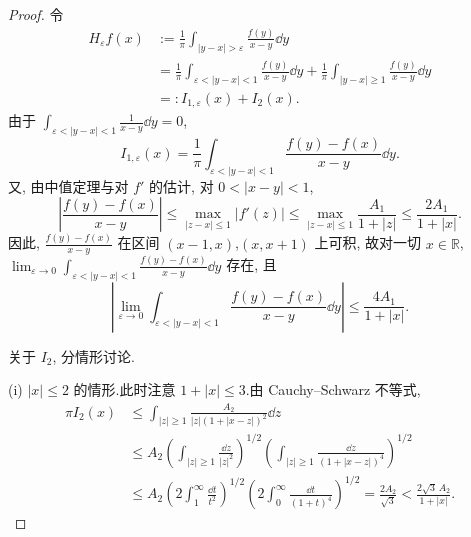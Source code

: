 \begin{proof}
令
\begin{align*}
H_{\varepsilon}f(x) & := \frac{1}{\pi}\int_{|y - x| > \varepsilon}\frac{f(y)}{x - y}\dd y \\
& = \frac{1}{\pi}\int_{\varepsilon < |y - x| < 1}\frac{f(y)}{x - y}\dd y + \frac{1}{\pi}\int_{|y - x| \geq 1}\frac{f(y)}{x - y}\dd y \\
& =: I_{1,\varepsilon}(x) + I_{2}(x).
\end{align*}
由于 $\int_{\varepsilon < |y - x| < 1}\frac{1}{x - y}\dd y = 0$, 
\begin{equation*}
I_{1,\varepsilon}(x) = \frac{1}{\pi}\int_{\varepsilon < |y - x| < 1}\frac{f(y) - f(x)}{x - y}\dd y.
\end{equation*}
又, 由中值定理与对 $f'$ 的估计, 对 $0 < |x - y| < 1$, 
\begin{equation*}
\left|\frac{f(y) - f(x)}{x - y}\right| \leq \max_{|z - x| \leq 1}|f'(z)| \leq \max_{|z - x| \leq 1}\frac{A_{1}}{1 + |z|} \leq \frac{2A_{1}}{1 + |x|}.
\end{equation*}
因此, $\frac{f(y) - f(x)}{x - y}$ 在区间 $(x - 1, x)$,$(x, x + 1)$ 上可积, 故对一切 $x \in \mathbb{R}$, $\lim_{\varepsilon \to 0}\int_{\varepsilon < |y - x| < 1}\frac{f(y) - f(x)}{x - y}\dd y$ 存在, 且
\begin{equation*}
\left|\lim_{\varepsilon \to 0}\int_{\varepsilon < |y - x| < 1}\frac{f(y) - f(x)}{x - y}\dd y\right| \leq \frac{4A_{1}}{1 + |x|}.
\end{equation*}

关于 $I_{2}$, 分情形讨论.

(i) $|x| \leq 2$ 的情形.此时注意 $1 + |x| \leq 3$.由 Cauchy--Schwarz 不等式, 
\begin{align*}
\pi I_{2}(x) &\leq \int_{|z| \geq 1}\frac{A_{2}}{|z|(1 + |x - z|)^{2}}\dd z \\
\quad &\leq A_{2}\left(\int_{|z| \geq 1}\frac{\dd z}{|z|^{2}}\right)^{1/2}\left(\int_{|z| \geq 1}\frac{\dd z}{(1 + |x - z|)^{4}}\right)^{1/2} \\
\quad &\leq A_{2}\left(2\int_{1}^{\infty}\frac{\dd t}{t^{2}}\right)^{1/2}\left(2\int_{0}^{\infty}\frac{\dd t}{(1 + t)^{4}}\right)^{1/2} = \frac{2A_{2}}{\sqrt{3}} < \frac{2\sqrt{3}\,A_{2}}{1 + |x|}.
\end{align*}


\end{proof}
